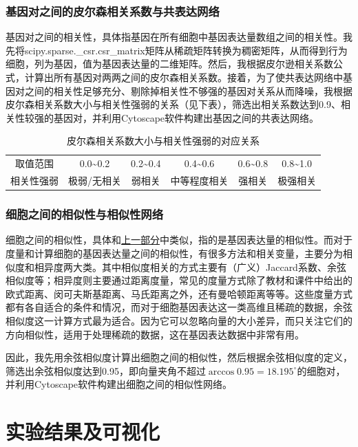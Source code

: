 \documentclass {article}
\begin{document}
		\subsubsection{基因对之间的皮尔森相关系数与共表达网络}
			\label{基因对之间皮尔森相关系数与共表达网络}
			基因对之间的相关性，具体指基因在所有细胞中基因表达量数组之间的相关性。我先将scipy.sparse.\_csr.csr\_matrix矩阵从稀疏矩阵转换为稠密矩阵，从而得到行为细胞，列为基因，值为基因表达量的二维矩阵。然后，我根据皮尔逊相关系数公式，计算出所有基因对两两之间的皮尔森相关系数。接着，为了使共表达网络中基因对之间的相关性足够充分、剔除掉相关性不够强的基因对关系从而降噪，我根据皮尔森相关系数大小与相关性强弱的关系（见下表），筛选出相关系数达到0.9、相关性较强的基因对，并利用Cytoscape软件构建出基因之间的共表达网络。
			\begin{table}[H]
				\centering
				\caption{皮尔森相关系数大小与相关性强弱的对应关系} 
				\begin{tabular}{cccccc}
					\hline
					取值范围 & 0.0\~{}0.2 & 0.2\~{}0.4 & 0.4\~{}0.6 & 0.6\~{}0.8 & 0.8\~{}1.0 \\
					相关性强弱 & 极弱/无相关 & 弱相关 & 中等程度相关 & 强相关 & 极强相关 \\
					\hline
				\end{tabular}
			\end{table}
		
		\subsubsection{细胞之间的相似性与相似性网络}
			细胞之间的相似性，具体和\hyperref[基因对之间皮尔森相关系数与共表达网络]{上一部分}中类似，指的是基因表达量的相似性。而对于度量和计算细胞的基因表达量之间的相似性，有很多方法和相关变量，主要分为相似度和相异度两大类。其中相似度相关的方式主要有（广义）Jaccard系数、余弦相似度等；相异度则主要通过距离度量，常见的度量方式除了教材和课件中给出的欧式距离、闵可夫斯基距离、马氏距离之外，还有曼哈顿距离等等。这些度量方式都有各自适合的条件和情况，而对于细胞基因表达这一类高维且稀疏的数据，余弦相似度这一计算方式最为适合。因为它可以忽略向量的大小差异，而只关注它们的方向相似性，适用于处理稀疏的数据，这在基因表达数据中非常有用。
			
			因此，我先用余弦相似度计算出细胞之间的相似性，然后根据余弦相似度的定义，筛选出余弦相似度达到0.95，即向量夹角不超过$ \arccos{0.95}=18.195^{\circ}$的细胞对，并利用Cytoscape软件构建出细胞之间的相似性网络。
		
\section{实验结果及可视化}
\end{document}
